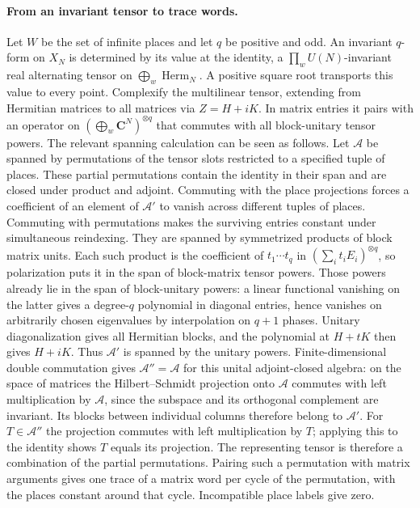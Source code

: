 \paragraph{From an invariant tensor to trace words.}
Let $W$ be the set of infinite places and let $q$ be positive and odd.
An invariant $q$-form on $X_N$ is determined by its value at the identity,
a $\prod_w U(N)$-invariant real alternating tensor on
$\bigoplus_w\operatorname{Herm}_N$. A positive square root transports
this value to every point. Complexify the multilinear tensor, extending
from Hermitian matrices to all matrices via $Z=H+iK$. In matrix entries it
pairs with an operator on $(\bigoplus_w\mathbf C^N)^{\otimes q}$ that
commutes with all block-unitary tensor powers. The relevant spanning
calculation can be seen as follows. Let $\mathcal A$ be spanned by
permutations of the tensor slots restricted to a specified tuple of
places. These partial permutations contain the identity in their span
and are closed under product and adjoint. Commuting with the place
projections forces a coefficient of an element of $\mathcal A'$ to
vanish across different tuples of places. Commuting with permutations
makes the surviving entries constant under simultaneous reindexing.
They are spanned by symmetrized products of block matrix units. Each
such product is the coefficient of $t_1\cdots t_q$ in
$(\sum_i t_i E_i)^{\otimes q}$, so polarization puts it in the span of
block-matrix tensor powers. Those powers already lie in the span of
block-unitary powers: a linear functional vanishing on the latter
gives a degree-$q$ polynomial in diagonal entries, hence vanishes
on arbitrarily chosen eigenvalues by interpolation on $q+1$ phases.
Unitary diagonalization gives all Hermitian blocks, and the polynomial
at $H+tK$ then gives $H+iK$. Thus $\mathcal A'$ is spanned by the
unitary powers. Finite-dimensional double commutation gives
$\mathcal A''=\mathcal A$ for this unital adjoint-closed algebra:
on the space of matrices the Hilbert--Schmidt projection onto $\mathcal A$
commutes with left multiplication by $\mathcal A$, since the subspace and its
orthogonal complement are invariant. Its blocks between individual columns
therefore belong to $\mathcal A'$. For $T\in\mathcal A''$ the projection
commutes with left multiplication by $T$; applying this to the identity
shows $T$ equals its projection.
The representing tensor is therefore a combination of the partial
permutations. Pairing such a permutation with matrix arguments gives one
trace of a matrix word per cycle of the permutation, with the places
constant around that cycle. Incompatible place labels give zero.
